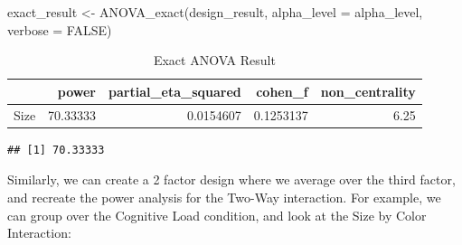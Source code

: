 \documentclass[
]{book}
\newenvironment{Shaded}{\begin{snugshade}}{\end{snugshade}}
\newcommand{\AttributeTok}[1]{\textcolor[rgb]{0.77,0.63,0.00}{#1}}
\newcommand{\CommentTok}[1]{\textcolor[rgb]{0.56,0.35,0.01}{\textit{#1}}}
\newcommand{\ConstantTok}[1]{\textcolor[rgb]{0.00,0.00,0.00}{#1}}
\newcommand{\FunctionTok}[1]{\textcolor[rgb]{0.00,0.00,0.00}{#1}}
\newcommand{\NormalTok}[1]{#1}
\newcommand{\OtherTok}[1]{\textcolor[rgb]{0.56,0.35,0.01}{#1}}
\newcommand{\SpecialCharTok}[1]{\textcolor[rgb]{0.00,0.00,0.00}{#1}}
\begin{document}
\begin{Shaded}
\begin{Highlighting}[]
\NormalTok{exact\_result }\OtherTok{\textless{}{-}} \FunctionTok{ANOVA\_exact}\NormalTok{(design\_result,}
                            \AttributeTok{alpha\_level =}\NormalTok{ alpha\_level,}
                            \AttributeTok{verbose =} \ConstantTok{FALSE}\NormalTok{)}
\end{Highlighting}
\end{Shaded}

\begin{table}[!h]

\caption{\label{tab:unnamed-chunk-181}Exact ANOVA Result}
\centering
\begin{tabular}[t]{l|r|r|r|r}
\hline
  & power & partial\_eta\_squared & cohen\_f & non\_centrality\\
\hline
Size & 70.33333 & 0.0154607 & 0.1253137 & 6.25\\
\hline
\end{tabular}
\end{table}

\begin{Shaded}
\end{Shaded}

\begin{verbatim}
## [1] 70.33333
\end{verbatim}

Similarly, we can create a 2 factor design where we average over the third factor, and recreate the power analysis for the Two-Way interaction. For example, we can group over the Cognitive Load condition, and look at the Size by Color Interaction:
\end{document}
